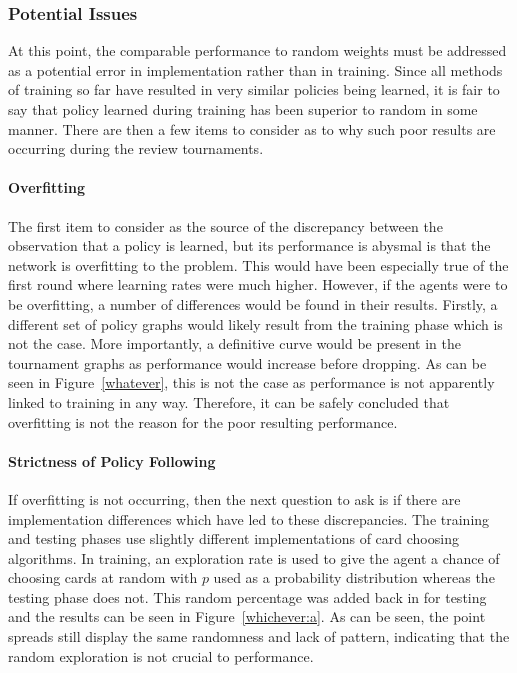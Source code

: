 
\subsubsection*{Potential Issues}
\label{sec:findings-r2-potentialissues}

At this point,
the comparable performance to random weights must be addressed as a potential
error in implementation rather than in training.
%
Since all methods of training so far have resulted in very similar policies
being learned,
it is fair to say that policy learned during training has been superior to
random in some manner.
%
There are then a few items to consider as to why such poor results are occurring
during the review tournaments.


\paragraph*{Overfitting}

The first item to consider as the source of the discrepancy between the
observation that a policy is learned,
but its performance is abysmal
is that the network is overfitting to the problem.
%
This would have been especially true of the first round where learning rates
were much higher.
%
However,
if the agents were to be overfitting,
a number of differences would be found in their results.
%
Firstly,
a different set of policy graphs would likely result from the training phase
which is not the case. %
%
More importantly,
a definitive curve would be present in the tournament graphs as performance
would increase before dropping.
%
As can be seen in Figure~\ref{whatever},
this is not the case
as performance is not apparently linked to training in any way.
%
Therefore, it can be safely concluded that overfitting is not the reason
for the poor resulting performance.

\paragraph*{Strictness of Policy Following}

If overfitting is not occurring,
then the next question to ask is if there are implementation differences which
have led to these discrepancies.
%
The training and testing phases use slightly different implementations of 
card choosing algorithms.
%
In training,
an exploration rate is used to give the agent a chance of choosing cards at
random with $p$ used as a probability distribution
whereas the testing phase does not.
%
This random percentage was added back in for testing and the results can be seen
in Figure~\ref{whichever:a}.
%
As can be seen,
the point spreads still display the same randomness and lack of pattern,
indicating that the random exploration is not crucial to performance.

